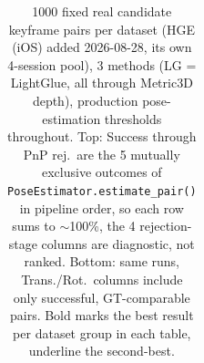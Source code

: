 \begin{table}[htb]
\begin{tabular*}{\textwidth}{@{\extracolsep{\fill}} lrrrr}
  \hline
  \end{tabular*}
  \caption[Matcher $\times$ depth rejection, accuracy, and timing]{1000 fixed real candidate
    keyframe pairs per dataset (HGE (iOS) added 2026-08-28, its own 4-session pool), 3 methods
    (LG = LightGlue, all through Metric3D depth), production pose-estimation thresholds
    throughout. Top: Success through PnP rej.\ are the 5 mutually exclusive outcomes of
    \texttt{PoseEstimator.estimate\_pair()} in pipeline order, so each row sums to $\sim$100\%,
    the 4 rejection-stage columns are diagnostic, not ranked. Bottom: same runs, Trans./Rot.\
    columns include only successful, GT-comparable pairs. Bold marks the best result per dataset
    group in each table, underline the second-best.}
  \label{tab:ablation-pe-rejection}
\end{table}
\renewcommand{\arraystretch}{1}

